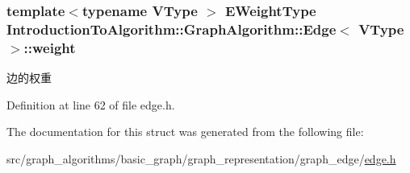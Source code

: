 \hypertarget{struct_introduction_to_algorithm_1_1_graph_algorithm_1_1_edge_a139b40cb4524df195804bdce7a117164}{}
\subsubsection[{weight}]{\setlength{\rightskip}{0pt plus 5cm}template$<$typename V\+Type $>$ {\bf E\+Weight\+Type} {\bf Introduction\+To\+Algorithm\+::\+Graph\+Algorithm\+::\+Edge}$<$ V\+Type $>$\+::weight}\label{struct_introduction_to_algorithm_1_1_graph_algorithm_1_1_edge_a139b40cb4524df195804bdce7a117164}
边的权重 

Definition at line 62 of file edge.\+h.



The documentation for this struct was generated from the following file\+:\begin{DoxyCompactItemize}
\item 
src/graph\+\_\+algorithms/basic\+\_\+graph/graph\+\_\+representation/graph\+\_\+edge/\hyperlink{edge_8h}{edge.\+h}\end{DoxyCompactItemize}
